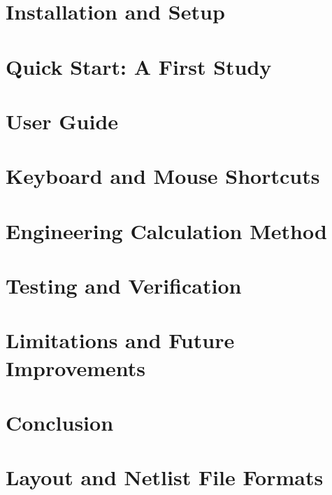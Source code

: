 \documentclass[11pt]{article}
\begin{document}
\section{Installation and Setup}\label{sec:installation}


\section{Quick Start: A First Study}\label{sec:quickstart}


\section{User Guide}\label{sec:userguide}


\section{Keyboard and Mouse Shortcuts}\label{sec:shortcuts}


\section{Engineering Calculation Method}\label{sec:calculation}


\section{Testing and Verification}\label{sec:testing}


\section{Limitations and Future Improvements}\label{sec:future}


\section{Conclusion}\label{sec:conclusion}


\clearpage


\clearpage
\appendix
\section{Layout and Netlist File Formats}\label{app:formats}

\end{document}
